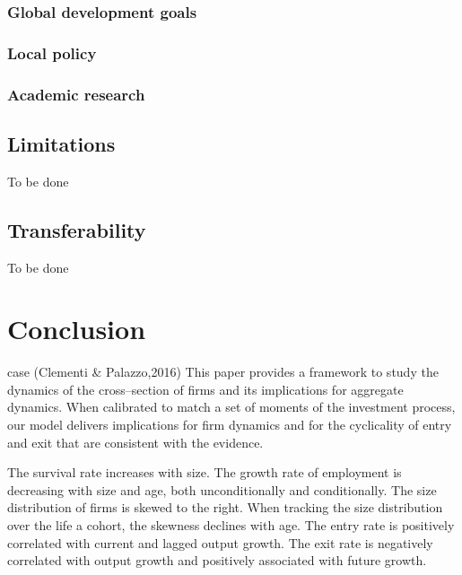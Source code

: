 \documentclass[
  12pt,
  oneside]{book}
\begin{document}
\hypertarget{global-development-goals}{%
\subsection{Global development goals}\label{global-development-goals}}

\hypertarget{local-policy}{%
\subsection{Local policy}\label{local-policy}}

\hypertarget{academic-research}{%
\subsection{Academic research}\label{academic-research}}

\hypertarget{limitations-1}{%
\section{Limitations}\label{limitations-1}}

To be done

\hypertarget{transferability}{%
\section{Transferability}\label{transferability}}

To be done

\hypertarget{conclusion}{%
\chapter{Conclusion}\label{conclusion}}

case (Clementi \& Palazzo,2016)
This paper provides a framework to study the dynamics of the cross--section of firms and its implications for aggregate dynamics. When calibrated to match a set of moments of the investment process, our model delivers implications for firm dynamics and for the cyclicality of entry and exit that are consistent with the evidence.

The survival rate increases with size. The growth rate of employment is decreasing with size and age, both unconditionally and conditionally. The size distribution of firms is skewed to the right. When tracking the size distribution over the life a cohort, the skewness declines with age. The entry rate is positively correlated with current and lagged output growth. The exit rate is negatively correlated with output growth and positively associated with future growth.
\end{document}
